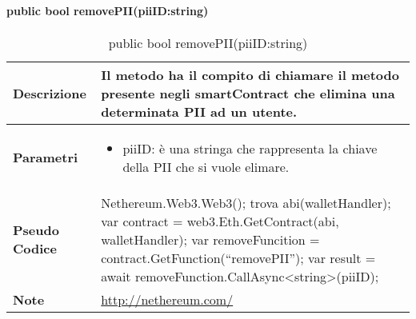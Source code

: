 \paragraph{public bool removePII(piiID:string)}
\begin{center}
    \begin{longtable}{|p{3cm}|p{9cm}|}%
    \caption{public bool removePII(piiID:string)}
    \label{tab:public-bool-removePIIImpl}
    \endfirsthead
    \endhead
    \hline
    \textbf{Descrizione} & Il metodo ha il compito di chiamare il metodo presente negli smartContract che elimina una determinata PII ad un utente.\\
    \hline
    \textbf{Parametri} &      
    \begin{itemize}
        \item piiID: è una stringa che rappresenta la chiave della PII che si vuole elimare.
    \end{itemize} 
    \\
    \hline
    \textbf{Pseudo Codice} & 
    Nethereum.Web3.Web3();\newline
    trova abi(walletHandler);\newline
    var contract = web3.Eth.GetContract(abi, walletHandler);\newline
    var removeFuncition = contract.GetFunction(“removePII”);\newline
    var result = await removeFunction.CallAsync<string>(piiID);\newline
    \\
    \hline
    \textbf{Note} & \url{http://nethereum.com/}\\
    \hline
    \end{longtable}
    \end{center}

